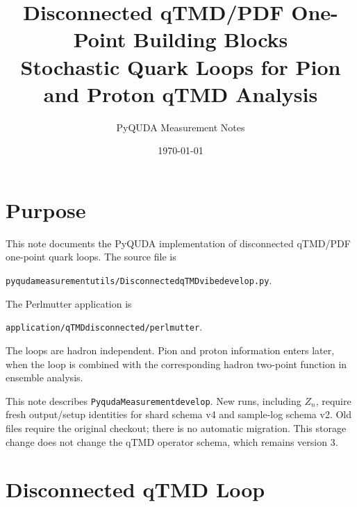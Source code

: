 \documentclass[11pt,a4paper]{article}
\title{\textbf{Disconnected qTMD/PDF One-Point Building Blocks}\\[4pt]
       \large Stochastic Quark Loops for Pion and Proton qTMD Analysis}
\author{PyQUDA Measurement Notes}
\date{\today}
\newcommand{\code}[1]{\texttt{\begingroup\def\_{\textunderscore\allowbreak}#1\endgroup}}
\begin{document}
\maketitle
\tableofcontents

\section{Purpose}

This note documents the PyQUDA implementation of disconnected qTMD/PDF
one-point quark loops.  The source file is
\begin{center}
\code{pyquda\_measurement\_utils/Disconnected\_1pt\_qTMD\_vibe\_develop.py}.
\end{center}
The Perlmutter application is
\begin{center}
\code{application/qTMD\_disconnected\_1pt/perlmutter}.
\end{center}

The loops are hadron independent.  Pion and proton information enters later,
when the loop is combined with the corresponding hadron two-point function in
ensemble analysis.

This note describes \code{Pyquda\_Measurement\_develop}. New runs, including
\(Z_n\), require fresh output/setup identities for shard schema v4 and
sample-log schema v2. Old files require the original checkout; there is no
automatic migration. This storage change does not change the qTMD operator
schema, which remains version 3.

\section{Disconnected qTMD Loop}
\end{document}

